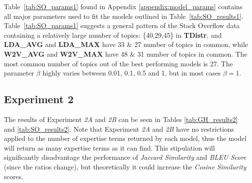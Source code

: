             Table~\ref{tab:SO_params1} found in Appendix \ref{appendix:model_params} contains all major parameters used to fit the models outlined in Table~\ref{tab:SO_results1}. Table~\ref{tab:SO_params1} suggests a general pattern of the Stack Overflow data containing a relatively large number of topics: \{40,29,45\} in  \textbf{TDistr}, and \textbf{LDA\_AVG} and \textbf{LDA\_MAX} have 33 \& 27 number of topics in common, while \textbf{W2V\_AVG} and \textbf{W2V\_MAX} have 48 \& 31 number of topics in common. The most common number of topics out of the best performing models is 27. The parameter $\beta$ highly varies between 0.01, 0.1, 0.5 and 1, but in most cases $\beta=1$.
        
        \subsection{Experiment 2}
            The results of Experiment \emph{2A} and \emph{2B} can be seen in Tables \ref{tab:GH_results2} and \ref{tab:SO_results2}. Note that Experiment \emph{2A} and \emph{2B} have no restrictions applied to the number of expertise terms returned by each model, thus the model will return as many expertise terms as it can find. This stipulation will significantly disadvantage the performance of \emph{Jaccard Similarity} and \emph{BLEU Score} (since the ratios change), but theoretically it could increase the \emph{Cosine Similarity} scores. 
            
